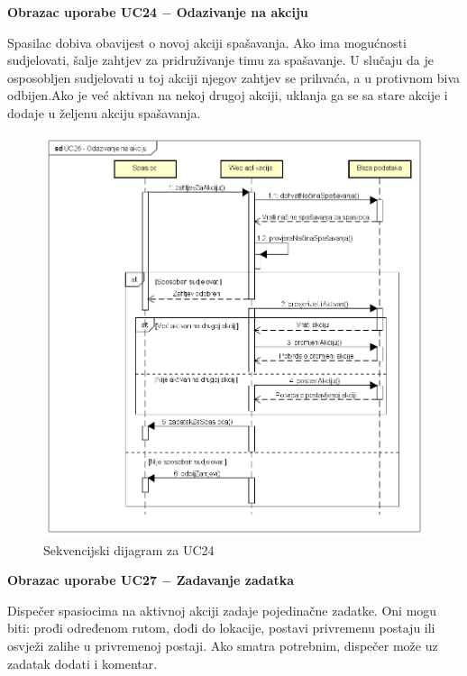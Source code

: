 \begin{packed_item}
				\item \textbf{Obrazac uporabe UC24 $-$ Odazivanje na akciju}
				\\
				\item[] \begin{packed_item}
					{Spasilac dobiva obavijest o novoj akciji spašavanja. Ako ima mogućnosti sudjelovati, šalje zahtjev za pridruživanje timu za spašavanje. U slučaju da je osposobljen sudjelovati u toj akciji njegov zahtjev se prihvaća, a u protivnom biva odbijen.Ako je već aktivan na nekoj drugoj akciji, uklanja ga se sa stare akcije i dodaje u željenu akciju spašavanja.}
					
					\begin{figure}[h!]
						\centering
						\includegraphics[width=\textwidth]{./slike/UC24.png}
						\caption{Sekvencijski dijagram za UC24}
						
					\end{figure}
					\eject
				\end{packed_item}
				\newpage
					
					
				\item \textbf{Obrazac uporabe UC27 $-$ Zadavanje zadatka}
				\\
				\item[] \begin{packed_item}
					{Dispečer spasiocima na aktivnoj akciji zadaje pojedinačne zadatke. Oni mogu biti: prođi određenom rutom, dođi do lokacije, postavi privremenu postaju ili osvježi zalihe u privremenoj postaji. Ako smatra potrebnim, dispečer može uz zadatak dodati i komentar.}
					

\end{packed_item}
\end{packed_item}
